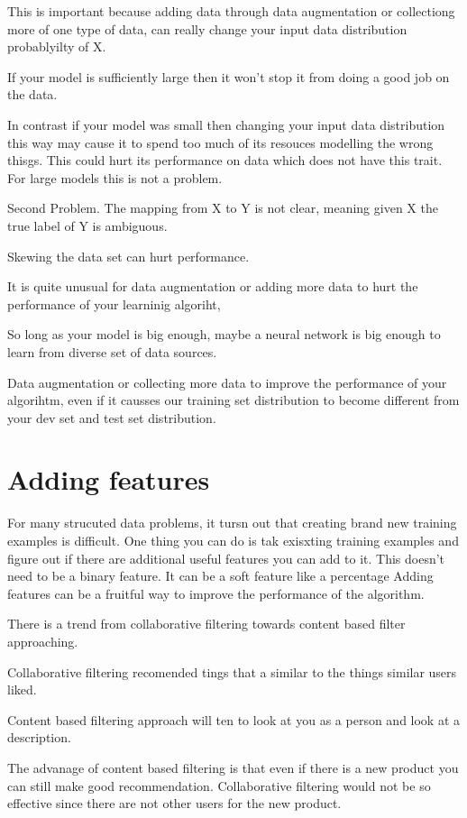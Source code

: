 This is important because adding data through data augmentation or collectiong more of one type of data, can really change your input data distribution probablyilty of X.

If your model is sufficiently large then it won't stop it from doing a good job on the data.

In contrast if your model was small then changing your input data distribution this way may cause it to spend too much of its resouces modelling the wrong thisgs.
This could hurt its performance on data which does not have this trait. For large models this is not a problem.

Second Problem.
The mapping from X to Y is not clear, meaning given X the true label of Y is ambiguous.

Skewing the data set can hurt performance.

It is quite unusual for data augmentation or adding more data to hurt the performance of your learninig algoriht,

So long as your model is big enough, maybe a neural network is big enough to learn from diverse set of data sources.

Data augmentation or collecting more data to improve the performance of your algorihtm, even if it causses our training set distribution to become different from your dev set and test set distribution.

\section{Adding features}

For many strucuted data problems, it tursn out that creating brand new training examples is difficult.
One thing you can do is tak exisxting training examples and figure out if there are additional useful features you can add to it.
This doesn't need to be a binary feature.
It can be a soft feature like a percentage
Adding features can be a fruitful way to improve the performance of the algorithm.


There is a trend from collaborative filtering towards content based filter approaching.


Collaborative filtering recomended tings that a similar to the things similar users liked.

Content based filtering approach will ten to look at you as a person and look at a description.

The advanage of content based filtering is that even if there is a new product you can still make good recommendation. Collaborative filtering would not be so effective since there are not other users for the new product.

